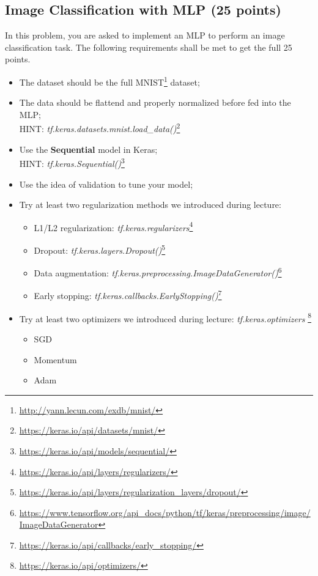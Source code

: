 \subsection{Image Classification with MLP (25 points)}
In this problem, you are asked to implement an MLP to perform an image classification task. The following requirements shall be met to get the full 25 points.
\begin{itemize}
    \item The dataset should be the full MNIST\footnote{\url{http://yann.lecun.com/exdb/mnist/}} dataset;
    \item The data should be flattend and properly normalized before fed into the MLP; \\
    HINT: \textit{tf.keras.datasets.mnist.load\_data()}\footnote{\url{https://keras.io/api/datasets/mnist/}}
    \item Use the \textbf{Sequential} model in Keras;\\
    HINT: \textit{tf.keras.Sequential()}\footnote{\url{https://keras.io/api/models/sequential/}}
    \item Use the idea of validation to tune your model;
    \item Try at least two regularization methods we introduced during lecture:
    \begin{itemize}
        \item L1/L2 regularization: \textit{tf.keras.regularizers}\footnote{\url{https://keras.io/api/layers/regularizers/}}
        \item Dropout: \textit{tf.keras.layers.Dropout()}\footnote{\url{https://keras.io/api/layers/regularization_layers/dropout/}}
        \item Data augmentation: \textit{tf.keras.preprocessing.ImageDataGenerator()}\footnote{\url{https://www.tensorflow.org/api_docs/python/tf/keras/preprocessing/image/ImageDataGenerator}}
        \item Early stopping: \textit{tf.keras.callbacks.EarlyStopping()}\footnote{\url{https://keras.io/api/callbacks/early_stopping/}}
    \end{itemize}
    \item Try at least two optimizers we introduced during lecture: \textit{tf.keras.optimizers} \footnote{\url{https://keras.io/api/optimizers/}}
        \begin{itemize}
        \item SGD
        \item Momentum
        \item Adam
    \end{itemize}
\end{itemize}

